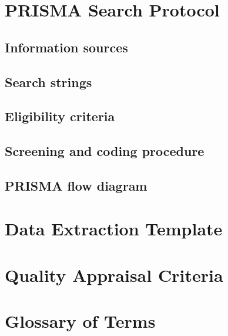 \documentclass[11pt,a4paper]{article}
\begin{document}


\appendix

\section{PRISMA Search Protocol}

\subsection{Information sources}

\subsection{Search strings}

\subsection{Eligibility criteria}

\subsection{Screening and coding procedure}

\subsection{PRISMA flow diagram}


\section{Data Extraction Template}


\section{Quality Appraisal Criteria}


\section{Glossary of Terms}




\end{document}

